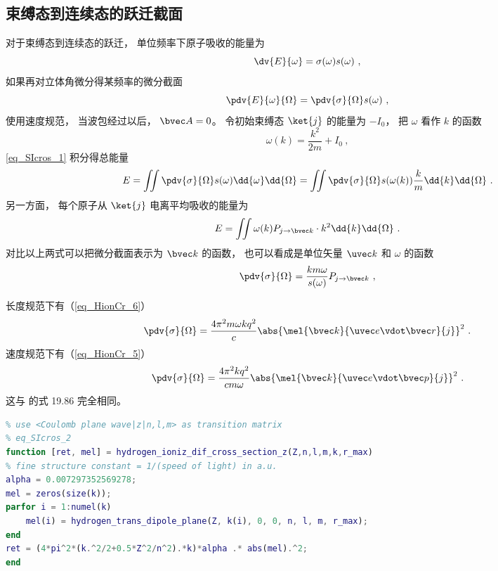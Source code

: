 \subsection{束缚态到连续态的跃迁截面}
对于束缚态到连续态的跃迁， 单位频率下原子吸收的能量为
\begin{equation}
\dv{E}{\omega} = \sigma(\omega) s(\omega)~,
\end{equation}
如果再对立体角微分得某频率的微分截面 %
\begin{equation}\label{eq_SIcros_1}
\pdv{E}{\omega}{\Omega} = \pdv{\sigma}{\Omega} s(\omega)~,
\end{equation}
使用速度规范， 当波包经过以后， $\bvec A = 0$。 令初始束缚态 $\ket{j}$ 的能量为 $-I_0$， 把 $\omega$ 看作 $k$ 的函数
\begin{equation}
\omega(k) = \frac{k^2}{2m} + I_0~,
\end{equation}
\autoref{eq_SIcros_1} 积分得总能量
\begin{equation}
E = \iint \pdv{\sigma}{\Omega} s(\omega) \dd{\omega}\dd{\Omega} = \iint \pdv{\sigma}{\Omega} s(\omega(k)) \frac{k}{m}\dd{k}\dd{\Omega}~.
\end{equation}
另一方面， 每个原子从 $\ket{j}$ 电离平均吸收的能量为
\begin{equation}
E = \iint \omega(k) P_{j\to {\bvec k}} \cdot k^2 \dd{k}\dd{\Omega}~.
\end{equation}
对比以上两式可以把微分截面表示为 $\bvec k$ 的函数， 也可以看成是单位矢量 $\uvec k$ 和 $\omega$ 的函数
\begin{equation}
\pdv{\sigma}{\Omega} = \frac{km \omega}{s(\omega)} P_{j\to \bvec k}~,
\end{equation}

长度规范下有（\autoref{eq_HionCr_6}）
\begin{equation}\label{eq_SIcros_2}
\pdv{\sigma}{\Omega} = \frac{4\pi^2 m\omega k q^2}{c} \abs{\mel{\bvec k}{\uvec e \vdot\bvec r}{j}}^2~.
\end{equation}
速度规范下有（\autoref{eq_HionCr_5}）
\begin{equation}\label{eq_SIcros_8}
\pdv{\sigma}{\Omega} = \frac{4\pi^2 k q^2}{c m \omega} \abs{\mel{\bvec k}{\uvec e \vdot \bvec p}{j}}^2~.
\end{equation}
这与 \cite{Merzbacher} 的式 19.86 完全相同。

\begin{lstlisting}[language=matlab, caption=hydrogen\_ioniz\_dif\_cross\_section\_z.m]
% hydrogen single ionization differential cross section
% use <Coulomb plane wave|z|n,l,m> as transition matrix
% eq_SIcros_2
function [ret, mel] = hydrogen_ioniz_dif_cross_section_z(Z,n,l,m,k,r_max)
% fine structure constant = 1/(speed of light) in a.u.
alpha = 0.007297352569278;
mel = zeros(size(k));
parfor i = 1:numel(k)
    mel(i) = hydrogen_trans_dipole_plane(Z, k(i), 0, 0, n, l, m, r_max);
end
ret = (4*pi^2*(k.^2/2+0.5*Z^2/n^2).*k)*alpha .* abs(mel).^2;
end
\end{lstlisting}

